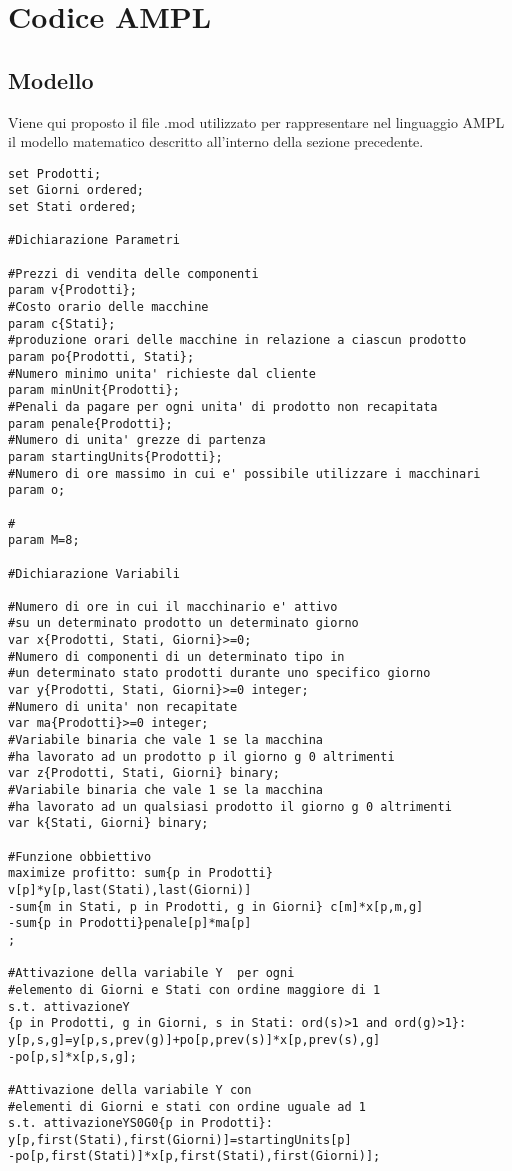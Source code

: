 \documentclass[12pt]{article}
\begin{document}
\section{Codice AMPL}
\subsection{Modello}
Viene qui proposto il file .mod utilizzato per rappresentare nel linguaggio AMPL il modello matematico descritto all'interno della sezione precedente.
\begin{lstlisting}
set Prodotti;
set Giorni ordered;
set Stati ordered;

#Dichiarazione Parametri

#Prezzi di vendita delle componenti
param v{Prodotti};
#Costo orario delle macchine
param c{Stati};
#produzione orari delle macchine in relazione a ciascun prodotto
param po{Prodotti, Stati};
#Numero minimo unita' richieste dal cliente
param minUnit{Prodotti};
#Penali da pagare per ogni unita' di prodotto non recapitata
param penale{Prodotti};
#Numero di unita' grezze di partenza
param startingUnits{Prodotti};
#Numero di ore massimo in cui e' possibile utilizzare i macchinari
param o;

#
param M=8;

#Dichiarazione Variabili

#Numero di ore in cui il macchinario e' attivo 
#su un determinato prodotto un determinato giorno
var x{Prodotti, Stati, Giorni}>=0;
#Numero di componenti di un determinato tipo in
#un determinato stato prodotti durante uno specifico giorno
var y{Prodotti, Stati, Giorni}>=0 integer;
#Numero di unita' non recapitate
var ma{Prodotti}>=0 integer;
#Variabile binaria che vale 1 se la macchina 
#ha lavorato ad un prodotto p il giorno g 0 altrimenti
var z{Prodotti, Stati, Giorni} binary;
#Variabile binaria che vale 1 se la macchina 
#ha lavorato ad un qualsiasi prodotto il giorno g 0 altrimenti
var k{Stati, Giorni} binary;

#Funzione obbiettivo
maximize profitto: sum{p in Prodotti} v[p]*y[p,last(Stati),last(Giorni)]
-sum{m in Stati, p in Prodotti, g in Giorni} c[m]*x[p,m,g]
-sum{p in Prodotti}penale[p]*ma[p]
;

#Attivazione della variabile Y  per ogni 
#elemento di Giorni e Stati con ordine maggiore di 1
s.t. attivazioneY
{p in Prodotti, g in Giorni, s in Stati: ord(s)>1 and ord(g)>1}:
y[p,s,g]=y[p,s,prev(g)]+po[p,prev(s)]*x[p,prev(s),g]
-po[p,s]*x[p,s,g];

#Attivazione della variabile Y con 
#elementi di Giorni e stati con ordine uguale ad 1
s.t. attivazioneYS0G0{p in Prodotti}:
y[p,first(Stati),first(Giorni)]=startingUnits[p]
-po[p,first(Stati)]*x[p,first(Stati),first(Giorni)];


\end{lstlisting}
\end{document}
